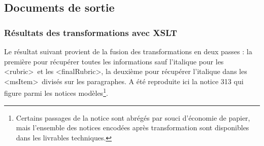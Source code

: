 \documentclass[a4paper,12pt,twoside]{book}
\begin{document}
	
	\subsection{Documents de sortie}
	
	\subsubsection{\label{resultats_XSLT}Résultats des transformations avec XSLT}
	
	Le résultat suivant provient de la fusion des transformations en deux passes : la première pour récupérer toutes les informations sauf l'italique pour les \textless rubric\textgreater~et les \textless finalRubric\textgreater, la deuxième pour récupérer l'italique dans les \textless msItem\textgreater~divisés sur les paragraphes. A été reproduite ici la notice 313 qui figure parmi les notices modèles\footnote{Certains passages de la notice sont abrégés par souci d'économie de papier, mais l'ensemble des notices encodées après transformation sont disponibles dans les livrables techniques.}. 
	
\end{document}
